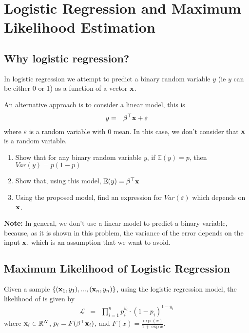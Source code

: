 \section{Logistic Regression and Maximum Likelihood Estimation}


\subsection{Why logistic regression?}

In logistic regression we attempt to predict a binary random variable $y$ (ie $y$ can be either 0 or 1) as a function of a vector ${\bf x}$. 

An alternative approach is to consider a linear model, this is
\begin{eqnarray}
y & = & \beta^\top {\bf x} + \varepsilon
\end{eqnarray}
where $\varepsilon$ is a random variable with 0 mean. In this case, we don't consider that ${\bf x}$ is a random variable.
\begin{enumerate}
    \item Show that for any binary random variable $y$, if  $\mathbb{E}(y) = p$, then $Var(y) = p(1-p)$
    \item Show that, using this model, $\mathbb{E}(y) = \beta^\top {\bf x}$
    \item Using the proposed model, find an expression for $Var(\varepsilon)$ which depends on ${\bf x}$. 
\end{enumerate}

\textbf{Note:} In general, we don't use a linear model to predict a binary variable, because, as it is shown in this problem, the variance of the error depends on the input ${\bf x}$, which is an assumption that we want to avoid.


\subsection{Maximum Likelihood of Logistic Regression}

Given a sample $\{({\bf x}_1,y_1),..., ({\bf x}_n,y_n)\}$, using the logistic regression model, the likelihood of is given by 
\begin{eqnarray}
\mathcal{L} & = & \prod_{i=1}^n p_i^{y_i} \cdot (1-p_i)^{1-y_i}
\end{eqnarray}
where ${\bf x}_i \in \mathbb{R}^N$, $p_i = F(\beta^\top {\bf x}_i)$, and $F(x) = \frac{\exp(x)}{1+\exp{x}}$.

